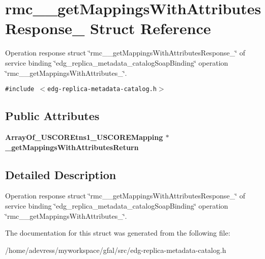 \section{rmc\_\-\_\-get\-Mappings\-With\-Attributes\-Response\_\- Struct Reference}
\label{structrmc____getMappingsWithAttributesResponse__}
Operation response struct \char`\"{}rmc\_\-\_\-get\-Mappings\-With\-Attributes\-Response\_\-\char`\"{} of service binding \char`\"{}edg\_\-replica\_\-metadata\_\-catalog\-Soap\-Binding\char`\"{} operation \char`\"{}rmc\_\-\_\-get\-Mappings\-With\-Attributes\_\-\char`\"{}.  


{\tt \#include $<$edg-replica-metadata-catalog.h$>$}

\subsection*{Public Attributes}
\begin{CompactItemize}
\item 
\bf{Array\-Of\_\-USCOREtns1\_\-USCOREMapping} $\ast$ \textbf{\_\-get\-Mappings\-With\-Attributes\-Return}\label{structrmc____getMappingsWithAttributesResponse___89993016d52d39fb17a8b724251b98ff}

\end{CompactItemize}


\subsection{Detailed Description}
Operation response struct \char`\"{}rmc\_\-\_\-get\-Mappings\-With\-Attributes\-Response\_\-\char`\"{} of service binding \char`\"{}edg\_\-replica\_\-metadata\_\-catalog\-Soap\-Binding\char`\"{} operation \char`\"{}rmc\_\-\_\-get\-Mappings\-With\-Attributes\_\-\char`\"{}. 



The documentation for this struct was generated from the following file:\begin{CompactItemize}
\item 
/home/adevress/myworkspace/gfal/src/edg-replica-metadata-catalog.h\end{CompactItemize}
